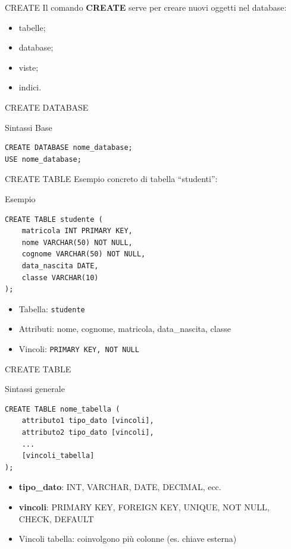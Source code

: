 \documentclass{beamer}
\begin{document}
\begin{frame}{CREATE}
Il comando \textbf{CREATE} serve per creare nuovi oggetti nel database:
\begin{itemize}
    \item tabelle;
    \item database;
    \item viste;
    \item indici.
\end{itemize}
\end{frame}


\begin{frame}[fragile]{CREATE DATABASE}
\begin{block}{Sintassi Base}
\begin{verbatim}
CREATE DATABASE nome_database;
USE nome_database;
\end{verbatim}
\end{block}
\end{frame}


\begin{frame}[fragile]{CREATE TABLE}
Esempio concreto di tabella “studenti”:

\begin{block}{Esempio}
\begin{verbatim}
CREATE TABLE studente (
    matricola INT PRIMARY KEY,
    nome VARCHAR(50) NOT NULL,
    cognome VARCHAR(50) NOT NULL,
    data_nascita DATE,
    classe VARCHAR(10)
);
\end{verbatim}
\end{block}

\begin{itemize}
    \item Tabella: \texttt{studente}
    \item Attributi: nome, cognome, matricola, data\_nascita, classe
    \item Vincoli: \texttt{PRIMARY KEY, NOT NULL}
\end{itemize}
\end{frame} 

\begin{frame}[fragile]{CREATE TABLE}
\begin{block}{Sintassi generale}
\begin{verbatim}
CREATE TABLE nome_tabella (
    attributo1 tipo_dato [vincoli],
    attributo2 tipo_dato [vincoli],
    ...
    [vincoli_tabella] 
);
\end{verbatim}
\end{block}

\begin{itemize}
    \item \textbf{tipo\_dato}: INT, VARCHAR, DATE, DECIMAL, ecc.
    \item \textbf{vincoli}: PRIMARY KEY, FOREIGN KEY, UNIQUE, NOT NULL, CHECK, DEFAULT
    \item Vincoli tabella: coinvolgono più colonne (es. chiave esterna)
\end{itemize}
\end{frame}
\end{document}
